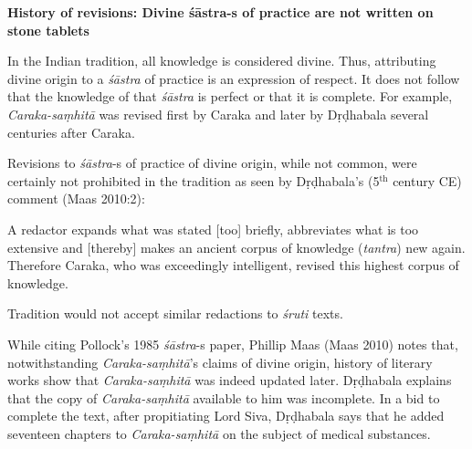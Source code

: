 {\bf History of revisions: Divine śāstra-s of practice are not written on stone tablets}

In the Indian tradition, all knowledge is considered divine.  Thus, attributing divine origin to a {\sl śāstra} of practice is an expression of respect.  It does not follow that the knowledge of that {\sl śāstra} is perfect or that it is complete.  For example, {\sl Caraka-saṃhitā} was revised first by Caraka and later by Dṛḍhabala several centuries after Caraka.

Revisions to {\sl śāstra}-s of practice of divine origin, while not common, were certainly not prohibited in the tradition as seen by Dṛḍhabala's (5$^{\text{th}}$ century CE) comment (Maas 2010:2):
\begin{myquote}
A redactor expands what was stated [too] briefly, abbreviates what is too extensive and [thereby] makes an ancient corpus of knowledge ({\sl tantra}) new again. Therefore Caraka, who was exceedingly intelligent, revised this highest corpus of knowledge.
\end{myquote}

Tradition would not accept similar redactions to {\sl śruti} texts.

While citing Pollock's 1985 {\sl śāstra}-s paper, Phillip Maas (Maas 2010) notes that, notwithstanding {\sl Caraka-saṃhitā}'s claims of divine origin, history of literary works show that {\sl Caraka-saṃhitā} was indeed updated later.  Dṛḍhabala explains that the copy of {\sl Caraka-saṃhitā} available to him was incomplete.  In a bid to complete the text, after propitiating Lord Siva, Dṛḍhabala says that he added seventeen chapters to {\sl Caraka-saṃhitā} on the subject of medical substances.

